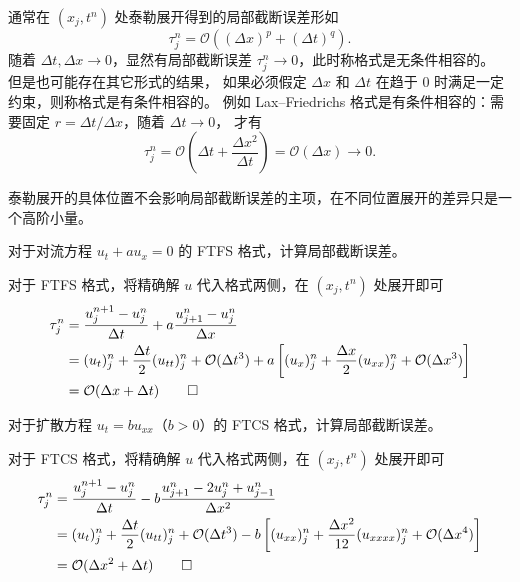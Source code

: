通常在 $(x_j,t^n)$ 处泰勒展开得到的局部截断误差形如
\[
    \tau_j^n =  \mathcal{O}((\Delta x)^p + (\Delta t)^q).
\]
随着 $\Delta t,\Delta x \to 0$，显然有局部截断误差 $\tau_j^n \to 0$，此时称格式是无条件相容的。
但是也可能存在其它形式的结果，
如果必须假定 $\Delta x$ 和 $\Delta t$ 在趋于 $0$ 时满足一定约束，则称格式是有条件相容的。
例如 Lax–Friedrichs 格式是有条件相容的：需要固定 $r = \Delta t/\Delta x$，随着 $\Delta t \to 0$，
才有
\[
    \tau_j^n =  \mathcal{O}\left(\Delta t + \frac{\Delta x^2}{\Delta t}\right) =  \mathcal{O}(\Delta x)\to 0.
\]

\begin{remark}
    泰勒展开的具体位置不会影响局部截断误差的主项，在不同位置展开的差异只是一个高阶小量。
\end{remark}

\begin{example}
    对于对流方程 $u_t + a u_x = 0$ 的 FTFS 格式，计算局部截断误差。
\end{example}

\begin{solution*}
    对于 FTFS 格式，将精确解 $u$ 代入格式两侧，在 $(x_j,t^n)$ 处展开即可
    \begin{align*}
        \tau_j^n ={} & \frac{u_j^{n+1}-u_j^n}{\Delta t} + a \frac{u_{j+1}^n - u_j^n}{\Delta x} \\
        ={}          & (u_t)_j^n + \frac{\Delta t}2 (u_{tt})_j^n + \mathcal{O}(\Delta t^3)
        + a \left[
            (u_x)_j^n + \frac{\Delta x}2 (u_{xx})_j^n + \mathcal{O}(\Delta x^3)
        \right]                                                                                \\
        ={}          & \mathcal{O}(\Delta x + \Delta t) \qedhere
    \end{align*}
\end{solution*}

\begin{example}
    对于扩散方程 $u_t = b u_{xx}$（$b>0$）的 FTCS 格式，计算局部截断误差。
\end{example}

\begin{solution*}
    对于 FTCS 格式，将精确解 $u$ 代入格式两侧，在 $(x_j,t^n)$ 处展开即可
    \begin{align*}
        \tau_j^n ={} & \frac{u_j^{n+1}-u_j^n}{\Delta t} - b \frac{u_{j+1}^n - 2 u_j^n + u_{j-1}^n}{\Delta x^2} \\
        ={}          & (u_t)_j^n + \frac{\Delta t}2 (u_{tt})_j^n + \mathcal{O}(\Delta t^3)
        - b \left[
            (u_{xx})_{j}^n + \frac{\Delta x^2}{12} (u_{xxxx})_j^n + \mathcal{O}(\Delta x^4)
        \right]                                                                                                \\
        ={}          & \mathcal{O}(\Delta x^2 + \Delta t)  \qedhere
    \end{align*}
\end{solution*}



